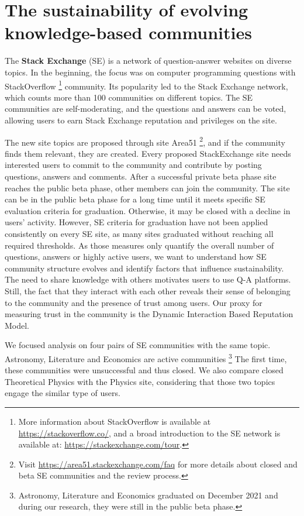 
\chapter{The sustainability of evolving knowledge-based communities} %
\label{Ch:Trust}

The \textbf{Stack Exchange} (SE) is a network of question-answer websites on diverse topics. In the beginning, the focus was on computer programming questions with StackOverflow \footnote{
	More information about StackOverflow is available at \url{https://stackoverflow.co/}, and a broad introduction to the SE network is available at: \url{https://stackexchange.com/tour}. 
}  community. Its popularity led to the Stack Exchange network, which counts more than 100 communities on different topics. The SE communities are self-moderating, and the questions and answers can be voted, allowing users to earn Stack Exchange reputation and privileges on the site. %

The new site topics are proposed through site Area51 \footnote{Visit \url{https://area51.stackexchange.com/faq} for more details about closed and beta SE communities and the review process.}, and if the community finds them relevant, they are created. Every proposed  StackExchange site needs interested users to commit to the community and contribute by posting questions, answers and comments. After a successful private beta phase site reaches the public beta phase, other members can join the community. The site can be in the public beta phase for a long time until it meets specific SE evaluation criteria for graduation. Otherwise, it may be closed with a decline in users’ activity. However, SE criteria for graduation have not been applied consistently on every SE site, as many sites graduated without reaching all required thresholds. As those measures only quantify the overall number of questions, answers or highly active users, we want to understand how SE community structure evolves and identify factors that influence sustainability. The need to share knowledge with others motivates users to use Q-A platforms. Still, the fact that they interact with each other reveals their sense of belonging to the community and the presence of trust among users. Our proxy for measuring trust in the community is the Dynamic Interaction Based Reputation Model.

We focused analysis on four pairs of SE communities with the same topic. Astronomy, Literature and Economics are active communities \footnote{Astronomy, Literature and Economics graduated on December 2021 and during our research, they were still in the public beta phase.} The first time, these communities were unsuccessful and thus closed. We also compare closed Theoretical Physics with the Physics site, considering that those two topics engage the similar type of users. 

